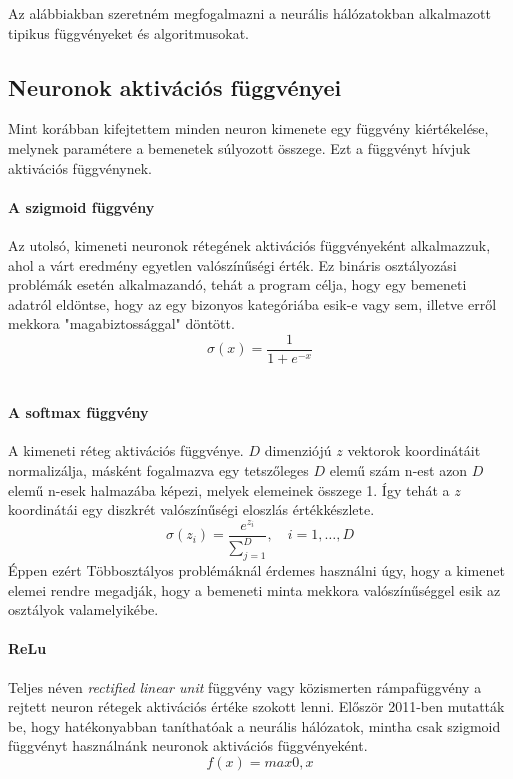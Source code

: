 Az alábbiakban szeretném megfogalmazni a neurális hálózatokban alkalmazott tipikus függvényeket és algoritmusokat.
\subsection{Neuronok aktivációs függvényei}
Mint korábban kifejtettem minden neuron kimenete egy függvény kiértékelése, melynek paramétere a bemenetek súlyozott összege. Ezt a függvényt hívjuk aktivációs függvénynek. 

\paragraph{A szigmoid függvény}
Az utolsó, kimeneti neuronok rétegének aktivációs függvényeként alkalmazzuk, ahol a várt eredmény egyetlen valószínűségi érték. Ez bináris osztályozási problémák esetén alkalmazandó, tehát a program célja, hogy egy bemeneti adatról eldöntse, hogy az egy bizonyos kategóriába esik-e vagy sem, illetve erről mekkora "magabiztossággal" döntött.
\begin{equation}
	\sigma(x)= \frac{1}{1+e^{-x}}
	\label{eq:sigmoid}
\end{equation}\

\paragraph{A softmax függvény}
A kimeneti réteg aktivációs függvénye. $D$ dimenziójú $z$ vektorok koordinátáit normalizálja, másként fogalmazva egy tetszőleges $D$ elemű szám n-est azon $D$ elemű n-esek halmazába képezi, melyek elemeinek összege 1. Így tehát a $z$ koordinátái egy diszkrét valószínűségi eloszlás értékkészlete. 
\begin{equation}
\sigma(z_i)=\frac{e^{z_i}}{\sum_{j=1}^{D}},\quad i = 1,\dots,D
\label{eq:softmax}
\end{equation}
Éppen ezért Többosztályos problémáknál érdemes használni úgy, hogy a kimenet elemei rendre megadják, hogy a bemeneti minta mekkora valószínűséggel esik az osztályok valamelyikébe.


\paragraph{ReLu}
Teljes néven \emph{rectified linear unit} függvény vagy közismerten rámpafüggvény a rejtett neuron rétegek aktivációs értéke szokott lenni. Először 2011-ben mutatták be, hogy hatékonyabban taníthatóak a neurális hálózatok, mintha csak szigmoid függvényt használnánk neuronok aktivációs függvényeként.\cite{wiki:relu}
\begin{equation}
	f(x) = max{0,x}
	\label{eq:relu}
\end{equation}

